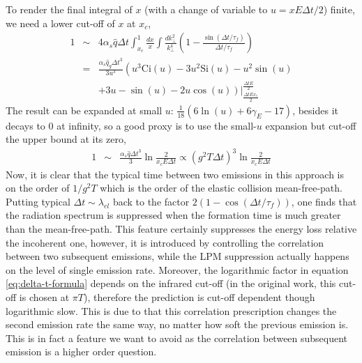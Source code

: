 \documentclass[aps, prc, reprint, amsmath, groupedaddress, nofootinbib]{revtex4-1}
\begin{document}
\begin{appendices}
To render the final integral of $x$ (with a change of variable to $u = xE\Delta t/2$) finite, we need a lower cut-off of $x$ at $x_c$,
\begin{eqnarray}
1 &\sim& 4\alpha_s\hat{q}\Delta t \int_{x_c}^1 \frac{dx}{x} \int \frac{dk_\perp^2}{k_\perp^4}\left(1-\frac{\sin(\Delta t/\tau_f)}{\Delta t/\tau_f}\right)\\
&=& \frac{\alpha_s\hat{q}_g \Delta t^3}{3u^3} \left( u^3\mathrm{Ci}(u)-3u^2\mathrm{Si}(u) - u^2 \sin(u) \right. \\\nonumber
&&\left. +3u-\sin(u) - 2u\cos(u) \right) \left.\right|_{\frac{\Delta t E x_c}{2}}^{\frac{\Delta t E}{2}} 
\end{eqnarray}
The result can be expanded at small $u$: $\frac{1}{18}(6\ln(u)+6\gamma_E - 17)$, besides it decays to $0$ at infinity, so a good proxy is to use the small-$u$ expansion but cut-off the upper bound at its zero,
\begin{eqnarray}
1 &\sim&  \frac{\alpha_s\hat{q}\Delta t^3}{3}\ln\frac{2}{ x_c E \Delta t } \propto (g^2 T \Delta t)^3 \ln\frac{2}{ x_c E \Delta t }
\label{eq:delta-t-formula}
\end{eqnarray}
Now, it is clear that the typical time between two emissions in this approach is on the order of $1/g^2T$ which is the order of the elastic collision mean-free-path.
Putting typical $\Delta t \sim \lambda_{el}$ back to the factor $2(1-\cos(\Delta t/\tau_f))$, one finds that the radiation spectrum is suppressed when the formation time is much greater than the mean-free-path.
This feature certainly suppresses the energy loss relative the incoherent one, however, it is introduced by controlling the correlation between two subsequent emissions, while the LPM suppression actually happens on the level of single emission rate.
Moreover, the logarithmic factor in equation \ref{eq:delta-t-formula} depends on the infrared cut-off (in the original work, this cut-off is chosen at $\pi T$), therefore the prediction is cut-off dependent though logarithmic slow.
This is due to that this correlation prescription changes the second emission rate the same way, no matter how soft the previous emission is.
This is in fact a feature we want to avoid as the correlation between subsequent emission is a higher order question.


\end{appendices}
\end{document}
